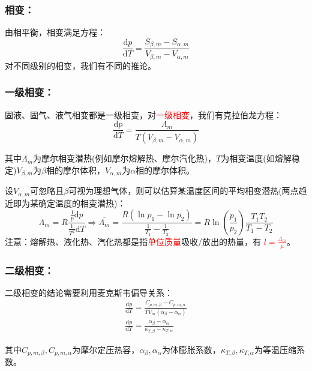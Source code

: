 \documentclass[zihao=-4,UTF8]{report}
\begin{document}
\subsubsection{相变：}
由相平衡，相变满足方程：
\begin{equation}
    \frac{\mathrm{d}p}{\mathrm{d}T} = \frac{S_{\beta,m} - S_{\alpha,m}}{V_{\beta,m}-V_{\alpha,m}}
\end{equation}
对不同级别的相变，我们有不同的推论。
\subsubsection{一级相变：}
固液、固气、液气相变都是一级相变，对\textcolor{red}{一级相变}，我们有克拉伯龙方程：
\begin{equation}
    \frac{\mathrm{d} p}{\mathrm{d}T} = \frac{\Lambda_m}{T(V_{\beta,m}-V_{\alpha,m})}
\end{equation}
{\par\color{gray}\small
其中$\Lambda_m$为摩尔相变潜热(例如摩尔熔解热、摩尔汽化热)，$T$为相变温度(如熔解稳定)$V_{\beta,m}$为$\beta$相的摩尔体积，$V_{\alpha,m}$为$\alpha$相的摩尔体积。\par
设$V_{\alpha,m}$可忽略且$\beta$可视为理想气体，则可以估算某温度区间的平均相变潜热(两点趋近即为某确定温度的相变潜热)：
\begin{equation}
   \Lambda_m = R\frac{\frac{1}{p}\mathrm{d}p}{\frac{1}{T^2}\mathrm{d}T}\Longrightarrow \overline{\Lambda_m} = \frac{R(\ln p_1 - \ln p_2)}{\frac{1}{T_1} - \frac{1}{T_2}} =  R\ln(\frac{p_1}{p_2})\frac{T_1T_2}{T_1 - T_2}
\end{equation}
注意：熔解热、液化热、汽化热都是指\textcolor{red}{单位质量}吸收/放出的热量，有 \textcolor{red}{ $l = \frac{\Lambda_m}{\mu}$}。
\par}

\subsubsection{二级相变：}
二级相变的结论需要利用麦克斯韦偏导关系：
\begin{gather}
    \frac{\mathrm{d} p}{\mathrm{d}T} = \frac{C_{p,m,\beta} - C_{p,m,\alpha}}{TV_m(\alpha_\beta - \alpha_\alpha)}\\
    \frac{\mathrm{d} p}{\mathrm{d}T} = \frac{\alpha_\beta - \alpha_\alpha}{\kappa_{T,\beta} - \kappa_{T,\alpha}}
\end{gather}
{\par\color{gray}\small
其中$C_{p,m,\beta}, C_{p,m,\alpha}$为摩尔定压热容，$\alpha_\beta, \alpha_\alpha$为体膨胀系数，$\kappa_{T,\beta}, \kappa_{T,\alpha}$为等温压缩系数。
\par}
\end{document}

